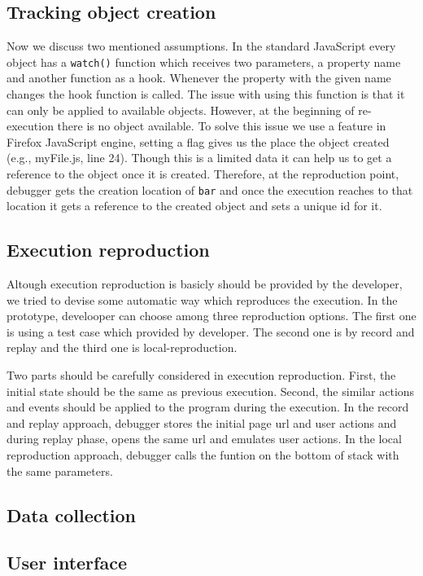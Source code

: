 \documentclass[preprint]{sigplanconf}
\begin{document}
\subsection{Tracking object creation}
Now we discuss two mentioned assumptions. In the standard JavaScript every object has a \texttt{watch()} function which receives two parameters, a property name and another function as a hook. Whenever the property with the given name changes the hook function is called. The issue with using this function is that it can only be applied to available objects. However, at the beginning of re-execution there is no object available. To solve this issue we use a feature in Firefox JavaScript engine, setting a flag gives us the place the object created (e.g., myFile.js, line 24). Though this is a limited data it can help us to get a reference to the object once it is created. Therefore, at the reproduction point, debugger gets the creation location of \texttt{bar} and once the execution reaches to that location it gets a reference to the created object and sets a unique id for it.

\subsection{Execution reproduction}
Altough execution reproduction is basicly should be provided by the developer, we tried to devise some automatic way which reproduces the execution. In the prototype, develooper can choose among three reproduction options. The first one is using a test case which provided by developer. The second one is by record and replay and the third one is local-reproduction.

Two parts should be carefully considered in execution reproduction. First, the initial state should be the same as previous execution. Second, the similar actions and events should be applied to the program during the execution. In the record and replay approach, debugger stores the initial page url and user actions and during replay phase, opens the same url and emulates user actions. 
In the local reproduction approach, debugger calls the funtion on the bottom of stack with the same parameters.

\subsection{Data collection}

\subsection{User interface}
\end{document}
